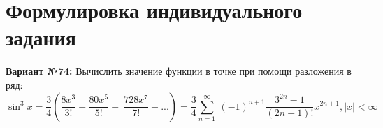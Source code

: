 \section{Формулировка индивидуального задания}

\textbf{Вариант №74:} Вычислить значение функции в точке при помощи разложения в ряд:
\begin{equation}
\sin^3 x = \frac{3}{4} (\frac{8x^3}{3!} - \frac{80x^5}{5!} +\
\frac{728x^7}{7!} - ...) = \frac{3}{4}\sum\limits_{n=1}^\infty\
(-1)^{n+1}\frac{3^{2n} - 1}{(2n+1)!}x^{2n+1}, |x| < \infty
\end{equation}